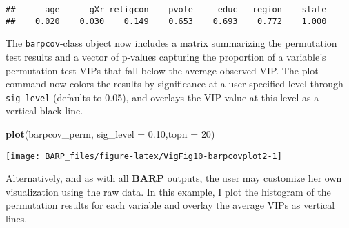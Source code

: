 \documentclass[]{article}
\newenvironment{Shaded}{\begin{snugshade}}{\end{snugshade}}
\newcommand{\KeywordTok}[1]{\textcolor[rgb]{0.13,0.29,0.53}{\textbf{#1}}}
\newcommand{\DataTypeTok}[1]{\textcolor[rgb]{0.13,0.29,0.53}{#1}}
\newcommand{\DecValTok}[1]{\textcolor[rgb]{0.00,0.00,0.81}{#1}}
\newcommand{\FloatTok}[1]{\textcolor[rgb]{0.00,0.00,0.81}{#1}}
\newcommand{\OperatorTok}[1]{\textcolor[rgb]{0.81,0.36,0.00}{\textbf{#1}}}
\newcommand{\NormalTok}[1]{#1}
\begin{document}
\begin{Shaded}
\end{Shaded}

\begin{verbatim}
##      age      gXr religcon    pvote     educ   region    state 
##    0.020    0.030    0.149    0.653    0.693    0.772    1.000
\end{verbatim}

The \texttt{barpcov}-class object now includes a matrix summarizing the
permutation test results and a vector of p-values capturing the
proportion of a variable's permutation test VIPs that fall below the
average observed VIP. The plot command now colors the results by
significance at a user-specified level through \texttt{sig\_level}
(defaults to 0.05), and overlays the VIP value at this level as a
vertical black line.

\begin{Shaded}
\begin{Highlighting}[]
\KeywordTok{plot}\NormalTok{(barpcov_perm,}
     \DataTypeTok{sig_level =} \FloatTok{0.10}\NormalTok{,}\DataTypeTok{topn =} \DecValTok{20}\NormalTok{)}
\end{Highlighting}
\end{Shaded}

\begin{center}\texttt{[image: BARP\_files/figure-latex/VigFig10-barpcovplot2-1]} \end{center}

Alternatively, and as with all \textbf{BARP} outputs, the user may
customize her own visualization using the raw data. In this example, I
plot the histogram of the permutation results for each variable and
overlay the average VIPs as vertical lines.
\end{document}
